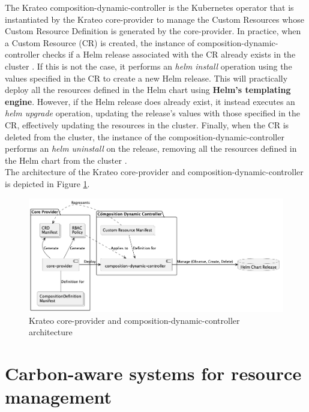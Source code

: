 The Krateo composition-dynamic-controller is the Kubernetes operator that is instantiated by the Krateo core-provider to manage the Custom Resources whose Custom Resource Definition is generated by the core-provider.
In practice, when a Custom Resource (CR) is created, the instance of composition-dynamic-controller checks if a Helm release associated with the CR already exists in the cluster \cite{krateo_composition_dynamic_controller}. 
If this is not the case, it performs an \textit{helm install} operation using the values specified in the CR to create a new Helm release. This will practically deploy all the resources defined in the Helm chart using \textbf{Helm's templating engine}.
However, if the Helm release does already exist, it instead executes an \textit{helm upgrade} operation, updating the release's values with those specified in the CR, effectively updating the resources in the cluster.
Finally, when the CR is deleted from the cluster, the instance of the composition-dynamic-controller performs an \textit{helm uninstall} on the release, removing all the resources defined in the Helm chart from the cluster \cite{krateo_composition_dynamic_controller}. \\

The architecture of the Krateo core-provider and composition-dynamic-controller is depicted in Figure \ref{fig:krateo_core_provider}.

\begin{figure}[htb]
    \centering
    \includegraphics[width=1\linewidth]{images/kraeto_core_provider.png}
    \caption{Krateo core-provider and composition-dynamic-controller architecture \cite{krateo_core_provider}}
    \label{fig:krateo_core_provider}
\end{figure}

\section{Carbon-aware systems for resource management}

